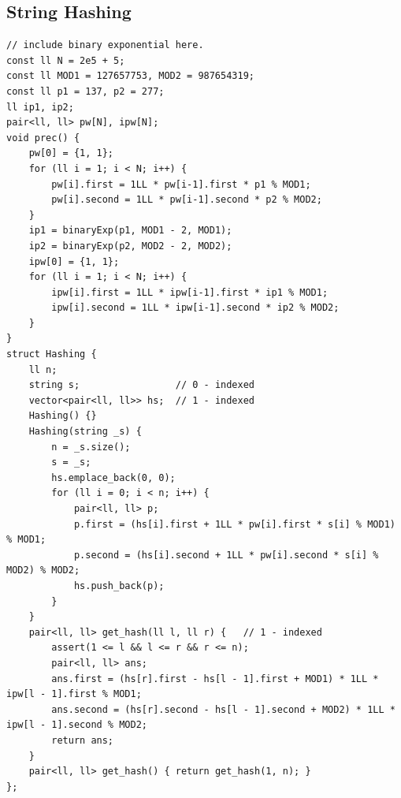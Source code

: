 \subsection{String Hashing}
\begin{lstlisting}
// include binary exponential here.
const ll N = 2e5 + 5;
const ll MOD1 = 127657753, MOD2 = 987654319;
const ll p1 = 137, p2 = 277;
ll ip1, ip2;
pair<ll, ll> pw[N], ipw[N];
void prec() {
    pw[0] = {1, 1};
    for (ll i = 1; i < N; i++) {
        pw[i].first = 1LL * pw[i-1].first * p1 % MOD1;
        pw[i].second = 1LL * pw[i-1].second * p2 % MOD2;
    }
    ip1 = binaryExp(p1, MOD1 - 2, MOD1);
    ip2 = binaryExp(p2, MOD2 - 2, MOD2);
    ipw[0] = {1, 1};
    for (ll i = 1; i < N; i++) {
        ipw[i].first = 1LL * ipw[i-1].first * ip1 % MOD1;
        ipw[i].second = 1LL * ipw[i-1].second * ip2 % MOD2;
    }
}
struct Hashing {
    ll n;
    string s;                 // 0 - indexed
    vector<pair<ll, ll>> hs;  // 1 - indexed
    Hashing() {}
    Hashing(string _s) {
        n = _s.size();
        s = _s;
        hs.emplace_back(0, 0);
        for (ll i = 0; i < n; i++) {
            pair<ll, ll> p;
            p.first = (hs[i].first + 1LL * pw[i].first * s[i] % MOD1) % MOD1;
            p.second = (hs[i].second + 1LL * pw[i].second * s[i] % MOD2) % MOD2;
            hs.push_back(p);
        }
    }
    pair<ll, ll> get_hash(ll l, ll r) {   // 1 - indexed
        assert(1 <= l && l <= r && r <= n);
        pair<ll, ll> ans;
        ans.first = (hs[r].first - hs[l - 1].first + MOD1) * 1LL * ipw[l - 1].first % MOD1;
        ans.second = (hs[r].second - hs[l - 1].second + MOD2) * 1LL * ipw[l - 1].second % MOD2;
        return ans;
    }
    pair<ll, ll> get_hash() { return get_hash(1, n); }
};
\end{lstlisting}
